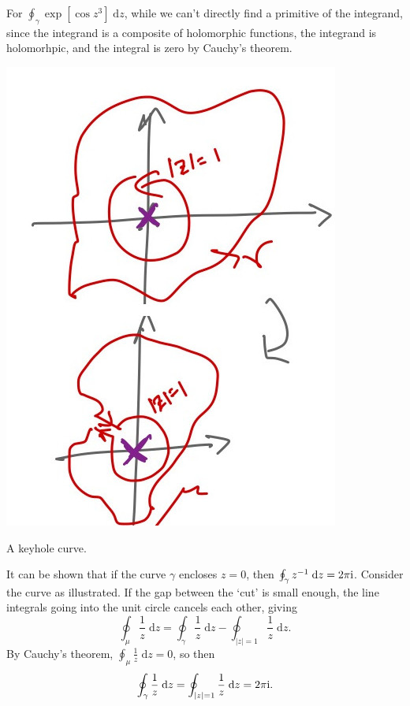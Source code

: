 \documentclass[letter-paper]{tufte-book}
\newenvironment{example}[1][Example]{\begin{trivlist}
\item[\hskip \labelsep {\bfseries #1}]}{\end{trivlist}}
\newcommand{\zi}{{\rm i}}
\begin{document}
\begin{example}
  For $\oint_\gamma \exp[\cos z^3]\; \mathrm{d}z$, while we can't directly find
  a primitive of the integrand, since the integrand is a composite of
  holomorphic functions, the integrand is holomorhpic, and the integral is zero
  by Cauchy's theorem.
\end{example}

\begin{example}
  \begin{marginfigure}
    \includegraphics{comp_keyhole}
    \caption{A keyhole curve.}
  \end{marginfigure}
  It can be shown that if the curve $\gamma$ encloses $z=0$, then $\oint_\gamma
  z^{-1}\; \mathrm{d}z = 2\pi \zi$. Consider the curve as illustrated. If the gap
  between the `cut' is small enough, the line integrals going into the unit
  circle cancels each other, giving
  \begin{equation*}
    \oint_\mu \frac{1}{z}\; \mathrm{d}z = \oint_\gamma \frac{1}{z}\; \mathrm{d}z - \oint_{|z| = 1} \frac{1}{z}\; \mathrm{d}z.
  \end{equation*}
  By Cauchy's theorem, $\oint_\mu \frac{1}{z}\; \mathrm{d}z = 0$, so then
  \begin{equation*}
    \oint_\gamma \frac{1}{z}\; \mathrm{d}z = \oint_{|z| = 1} \frac{1}{z}\; \mathrm{d}z = 2\pi \zi.
  \end{equation*}
\end{example}
\end{document}
